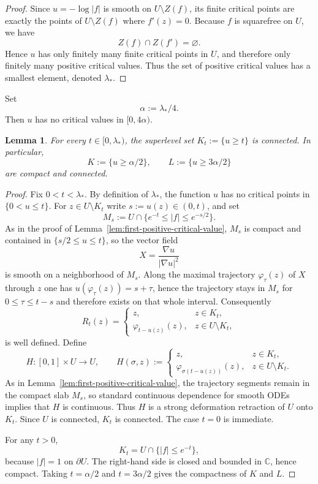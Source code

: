 \documentclass[12pt]{amsart}
\theoremstyle{definition}
\newtheorem{lemma}[theorem]{Lemma}
\theoremstyle{remark}
\begin{document}
\begin{proof}
\indent Since $u=-\log|f|$ is smooth on $U\setminus Z(f)$, its finite critical points are exactly
the points of $U\setminus Z(f)$ where $f'(z)=0$. Because $f$ is squarefree on $U$, we have
\[
Z(f)\cap Z(f')=\varnothing.
\]
Hence $u$ has only finitely many finite critical points in $U$, and therefore only finitely many
positive critical values. Thus the set of positive critical values has a smallest element, denoted
$\lambda_*$. \end{proof}

\medskip
\noindent Set
\[
 \alpha:=\lambda_*/4.
\]
Then $u$ has no critical values in $[0,4\alpha)$.

\medskip
\begin{lemma}\label{lem:superlevel-connected}
\emph{For every $t\in [0,\lambda_*)$, the superlevel set $K_t:=\{u\ge t\}$ is connected. In particular,}
\[
 K:=\{u\ge \alpha/2\},\qquad L:=\{u\ge 3\alpha/2\}
\]
\emph{are compact and connected.}
\end{lemma}

\begin{proof} Fix $0<t<\lambda_*$. By definition of $\lambda_*$, the function $u$ has no critical points in $\{0<u\le t\}$. For
$z\in U\setminus K_t$ write $s:=u(z)\in(0,t)$, and set
\[
 M_s:=U\cap\{e^{-t}\le |f|\le e^{-s/2}\}.
\]
As in the proof of Lemma~\ref{lem:first-positive-critical-value}, $M_s$ is compact and contained in $\{s/2\le u\le t\}$, so the vector field
\[
 X=\frac{\nabla u}{|\nabla u|^2}
\]
is smooth on a neighborhood of $M_s$. Along the maximal trajectory $\varphi_\tau(z)$ of $X$ through $z$ one has
$u(\varphi_\tau(z))=s+\tau$, hence the trajectory stays in $M_s$ for $0\le \tau\le t-s$ and therefore exists on that
whole interval. Consequently
\[
 R_t(z)=\begin{cases}
 z, & z\in K_t,\\
 \varphi_{t-u(z)}(z), & z\in U\setminus K_t,
 \end{cases}
\]
is well defined. Define
\[
H:[0,1]\times U\to U,
\qquad
H(\sigma,z):=\begin{cases}
z, & z\in K_t,\\
\varphi_{\sigma(t-u(z))}(z), & z\in U\setminus K_t.
\end{cases}
\]
As in Lemma~\ref{lem:first-positive-critical-value}, the trajectory segments remain in the compact slab $M_s$, so standard
continuous dependence for smooth ODEs implies that $H$ is continuous. Thus $H$ is a strong
deformation retraction of $U$ onto $K_t$. Since $U$ is connected, $K_t$ is connected. The
case $t=0$ is immediate.

\indent For any $t>0$,
\[
 K_t=U\cap \{|f|\le e^{-t}\},
\]
because $|f|=1$ on $\partial U$. The right-hand side is closed and bounded in $\mathbb{C}$, hence compact. Taking
$t=\alpha/2$ and $t=3\alpha/2$ gives the compactness of $K$ and $L$. \end{proof}
\end{document}

